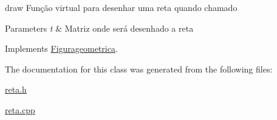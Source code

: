 draw Função virtual para desenhar uma reta quando chamado 


\begin{DoxyParams}{Parameters}
{\em t} & Matriz onde será desenhado a reta \\
\hline
\end{DoxyParams}


Implements \mbox{\hyperlink{class_figurageometrica_a68d9aba508879bb7a9ea1fe9d1d4f5f4}{Figurageometrica}}.



The documentation for this class was generated from the following files\+:\begin{DoxyCompactItemize}
\item 
\mbox{\hyperlink{reta_8h}{reta.\+h}}\item 
\mbox{\hyperlink{reta_8cpp}{reta.\+cpp}}\end{DoxyCompactItemize}
